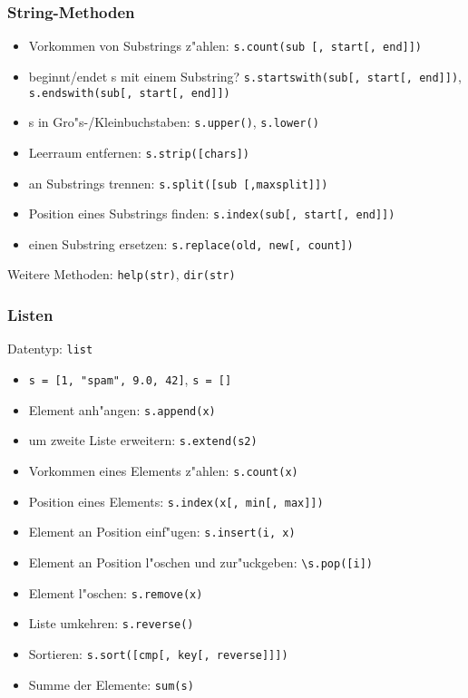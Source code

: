 \begin{frame}
\frametitle{String-Methoden}
\begin{itemize}
\item Vorkommen von Substrings z"ahlen: \lstinline{s.count(sub [, start[, end]])}
\item beginnt/endet s mit einem Substring? \lstinline{s.startswith(sub[, start[, end]])}, \lstinline{s.endswith(sub[, start[, end]])}
\item s in Gro"s-/Kleinbuchstaben: \lstinline{s.upper()}, \lstinline{s.lower()}
\item Leerraum entfernen: \lstinline{s.strip([chars])}
\item an Substrings trennen: \lstinline{s.split([sub [,maxsplit]])}
\item Position eines Substrings finden: \lstinline{s.index(sub[, start[, end]])}
\item einen Substring ersetzen: \lstinline{s.replace(old, new[, count])}
\end{itemize}
Weitere Methoden: \lstinline{help(str)}, \lstinline{dir(str)}
\end{frame}

\begin{frame}
\frametitle{Listen}
Datentyp: \texttt{list}
\begin{itemize}
\item \lstinline{s = [1, "spam", 9.0, 42]}, \lstinline{s = []}
\item Element anh"angen: \lstinline{s.append(x)}
\item um zweite Liste erweitern: \lstinline{s.extend(s2)}
\item Vorkommen eines Elements z"ahlen: \lstinline{s.count(x)}
\item Position eines Elements: \lstinline{s.index(x[, min[, max]])}
\item Element an Position einf"ugen: \lstinline{s.insert(i, x)}
\item Element an Position l"oschen und zur"uckgeben: \lstinline{\s.pop([i])}
\item Element l"oschen: \lstinline{s.remove(x)}
\item Liste umkehren: \lstinline{s.reverse()}
\item Sortieren: \lstinline{s.sort([cmp[, key[, reverse]]])}
\item Summe der Elemente: \lstinline{sum(s)}
\end{itemize}
\end{frame}

